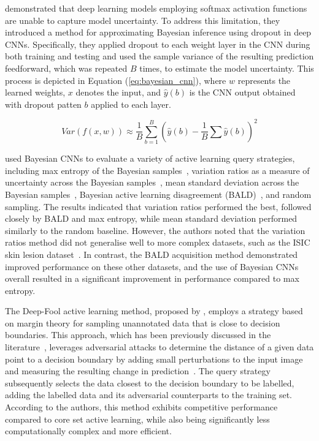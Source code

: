 \cite{gal2016dropout} demonstrated that deep learning models employing softmax activation functions are unable to capture model uncertainty. To address this limitation, they introduced a method for approximating Bayesian inference using dropout in deep CNNs. Specifically, they applied dropout to each weight layer in the CNN during both training and testing and used the sample variance of the resulting prediction feedforward, which was repeated $B$ times, to estimate the model uncertainty. This process is depicted in Equation (\ref{eq:bayesian_cnn}), where $w$ represents the learned weights, $x$ denotes the input, and $\widehat{y}(b)$ is the CNN output obtained with dropout patten $b$ applied to each layer.

\begin{equation}
	Var(f(x, w))\approx\frac{1}{B}\sum^B_{b=1}\left(\widehat{y}(b)-\frac{1}{B}\sum\widehat{y}(b)\right)^2
	\label{eq:bayesian_cnn}
\end{equation}

\cite{gal2017deep} used Bayesian CNNs to evaluate a variety of active learning query strategies, including max entropy of the Bayesian samples~\citep{shannon1948mathematical}, variation ratios as a measure of uncertainty across the Bayesian samples~\citep{freeman1965elementary}, mean standard deviation across the Bayesian samples~\citep{kampffmeyer2016semantic}, Bayesian active learning disagreement (BALD)~\citep{houlsby2011bayesian}, and random sampling. The results indicated that variation ratios performed the best, followed closely by BALD and max entropy, while mean standard deviation performed similarly to the random baseline. However, the authors noted that the variation ratios method did not generalise well to more complex datasets, such as the ISIC skin lesion dataset~\citep{gutman2016skin}. In contrast, the BALD acquisition method demonstrated improved performance on these other datasets, and the use of Bayesian CNNs overall resulted in a significant improvement in performance compared to max entropy.

The Deep-Fool active learning method, proposed by \cite{ducoffe2018adversarial}, employs a strategy based on margin theory for sampling unannotated data that is close to decision boundaries. This approach, which has been previously discussed in the literature~\citep{settles2009active}, leverages adversarial attacks to determine the distance of a given data point to a decision boundary by adding small perturbations to the input image and measuring the resulting change in prediction~\citep{kurakin2018adversarial}. The query strategy subsequently selects the data closest to the decision boundary to be labelled, adding the labelled data and its adversarial counterparts to the training set.  According to the authors, this method exhibits competitive performance compared to core set active learning, while also being significantly less computationally complex and more efficient.

